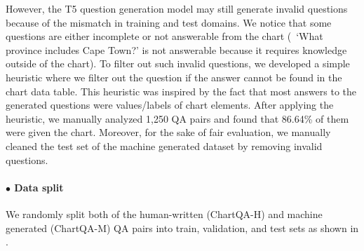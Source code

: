 However, the T5 question generation model may still generate invalid questions because of the mismatch in training and test domains. We notice that some questions are either incomplete or not answerable from the chart (\eg\ `What province includes Cape Town?' is not answerable because it requires knowledge outside of the chart).
To filter out such invalid questions, we developed a simple heuristic where we filter out the question if the answer cannot be found in the chart data table. This heuristic was inspired by the fact that most answers to the generated questions were  values/labels of chart elements.
After applying the heuristic, we manually analyzed 1,250 QA pairs and found that {86.64\%} of them were  given the chart. Moreover, for the sake of fair  evaluation, we manually cleaned the test set of the machine generated dataset by removing invalid questions.



\paragraph{$\bullet$ Data split}
We randomly split both of the human-written (ChartQA-H) and machine generated (ChartQA-M) QA pairs into train, validation, and test sets as shown in  . 


\begin{table}[t!]
\centering
\small
{}
\caption{\small Number of charts from each source. Statista-H and Statista-M refer to the datasets with human-written and machine generated questions respectively from Statista
}
\label{tab:dataset-chart-count}
\end{table}


